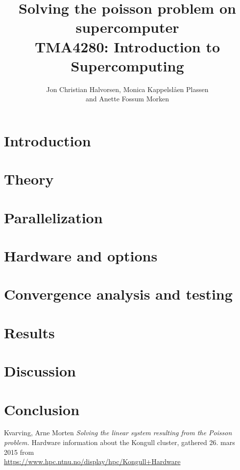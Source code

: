 \documentclass[12pt, a4paper]{article} %
\title{Solving the poisson problem on supercomputer \\
TMA4280: Introduction to Supercomputing}
\author[]{Jon Christian Halvorsen, Monica Kappelslåen Plassen \\and Anette Fossum Morken}
\date{}
\begin{document}
\maketitle
{}

\section*{Introduction}


\section*{Theory}


\section*{Parallelization}

 
\section*{Hardware and options}
 
 
\section*{Convergence analysis and testing}


\section*{Results}


\section*{Discussion}


\section*{Conclusion}



\begin{thebibliography}{10}
 Kvarving, Arne Morten \emph{Solving the linear system resulting from the Poisson problem.}
 Hardware information about the Kongull cluster, gathered 26. mars 2015 from \\ \url{https://www.hpc.ntnu.no/display/hpc/Kongull+Hardware}
\end{thebibliography}
\end{document}
